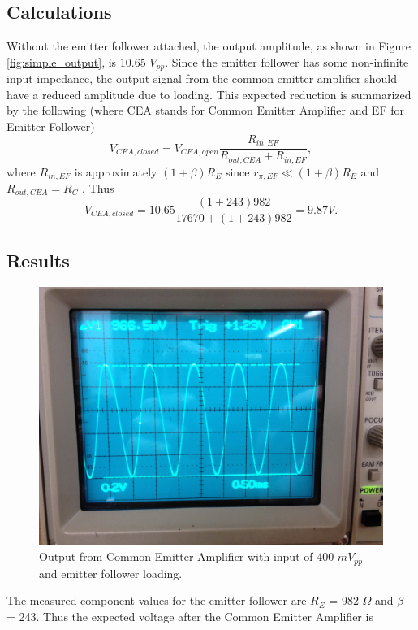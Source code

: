 \documentclass[12pt,letterpaper]{report}
\newlength \figwidth
\begin{document}
\subsection*{Calculations}

Without the emitter follower attached, the output amplitude, as shown in Figure \ref{fig:simple_output}, is 10.65 $V_{pp}$. Since the emitter follower has some non-infinite input impedance, the output signal from the common emitter amplifier should have a reduced amplitude due to loading. This expected reduction is summarized by the following (where CEA stands for Common Emitter Amplifier and EF for Emitter Follower)
$$
V_{CEA,closed} = V_{CEA,open}\frac{R_{in,EF}}{R_{out,CEA}+R_{in,EF}},
$$
where $R_{in,EF}$ is approximately $(1+\beta)R_E$ since $r_{\pi,EF} \ll (1+\beta)R_E$ and $R_{out,CEA} = R_C$ . Thus
$$
V_{CEA,closed} = 10.65 \frac{(1+243)982}{17670+(1+243)982} = 9.87 V.
$$


\subsection*{Results}

\begin{figure}[H]
\centering
\includegraphics[width=\figwidth, keepaspectratio=true]{lab6_images/loading_output.jpg}
\caption{Output from Common Emitter Amplifier with input of 400 $mV_{pp}$ and emitter follower loading.}
\label{fig:loading_output}
\end{figure}

The measured component values for the emitter follower are $R_{E}$ = 982 $\Omega$ and $\beta$ = 243. Thus the expected voltage after the Common Emitter Amplifier is
\end{document}
